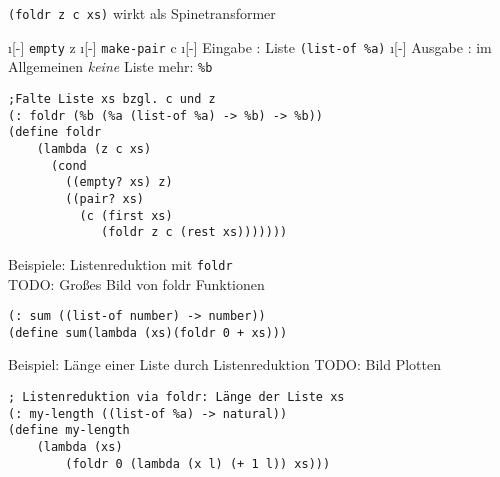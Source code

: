 \lstinline|(foldr z c xs)| wirkt als Spinetransformer
\begin{itemize}
	\i[-] \lstinline|empty| \eval z
	\i[-] \lstinline|make-pair| \eval c
	\i[-] Eingabe : Liste \lstinline|(list-of %a)|
	\i[-] Ausgabe : im Allgemeinen \emph{keine} Liste mehr: \lstinline|%b|
\end{itemize}
\begin{lstlisting}
;Falte Liste xs bzgl. c und z
(: foldr (%b (%a (list-of %a) -> %b) -> %b))
(define foldr
	(lambda (z c xs)
	  (cond 
	    ((empty? xs) z)
	    ((pair? xs)
	      (c (first xs)
	         (foldr z c (rest xs)))))))
\end{lstlisting}
Beispiele: Listenreduktion mit \lstinline|foldr|\\
TODO: Gro\ss es Bild von foldr Funktionen
\begin{lstlisting}
(: sum ((list-of number) -> number))
(define sum(lambda (xs)(foldr 0 + xs)))
\end{lstlisting}
Beispiel: Länge einer Liste durch Listenreduktion
TODO: Bild Plotten
\begin{lstlisting}
; Listenreduktion via foldr: Länge der Liste xs
(: my-length ((list-of %a) -> natural))
(define my-length
	(lambda (xs)
		(foldr 0 (lambda (x l) (+ 1 l)) xs)))
\end{lstlisting}
